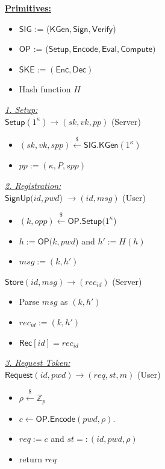 \documentclass[conference]{IEEEtran}
\newcommand{\secparameter}{\kappa}
\newcommand{\pwd}{pwd}
\newcommand{\sk}{sk}
\newcommand{\vk}{vk}
\newcommand{\pp}{pp}
\newcommand{\uid}{id}
\def\mg{\color{magenta}}
\begin{document}
\begin{figure}
\begin{multicols}{2} \raggedcolumns
\scriptsize
\underline{{\bf Primitives:}}
\begin{itemize}
    \item %
    $\mathsf{SIG}$ := ($\mathsf{KGen}, \mathsf{Sign}, \mathsf{Verify}$)
    \item %
    $\mathsf{OP}$ := ($\mathsf{Setup}, \mathsf{Encode}, \mathsf{Eval}, \mathsf{Compute})$
    \item %
    $\mathsf{SKE} := (\mathsf{Enc}, \mathsf{Dec})$
    \item Hash function $H$
\end{itemize}

\vspace{3mm}
\underline{{\em1. Setup:}}\\
$\mathsf{Setup}(1^{\secparameter}) \rightarrow (\sk, \vk, \pp)$ \hspace*{\fill} (Server) 
\begin{itemize}
    \item $(\sk,\vk, spp) \xleftarrow{\$} \mathsf{SIG.KGen}(1^{\secparameter})$ 
    \item $\pp := (\secparameter, P, spp)$ 
\end{itemize}
\underline{{\em2. Registration:}}\\
$\mathsf{SignUp}(\uid, \pwd$) $\rightarrow (\uid,msg)$ \hspace*{\fill} (User)
\begin{itemize}
    \item  $(k,opp) \xleftarrow{\$} \mathsf{OP.Setup}(1^{\secparameter}$) 
    \item  $h := \mathsf{OP}(k,\pwd$) and $h' := H(h)$
    \item  $msg := (k,h')$ %
\end{itemize}

$\mathsf{Store}(\uid, msg) \rightarrow (rec_{\uid})$ \hspace*{\fill} (Server)
\begin{itemize}
    \item Parse $msg$ as $(k,h')$
    \item $rec_{\uid} := (k,h')$
    \item $\mathsf{Rec}[\uid] = rec_{\uid}$
\end{itemize}

\columnbreak
\underline{{\em3. Request Token:}}\\
$\mathsf{Request}(\uid,\pwd) \rightarrow (req,st,m)$ \hspace*{\fill} (User)
\begin{itemize}
    \item $\rho \xleftarrow{\$} \mathbb{Z}_{p}$
    \item $c \leftarrow \mathsf{OP.Encode}(\pwd, \rho)$.
    \item $req := c$ and $st =: (\uid, \pwd, \rho)$
    \item return $req$
\end{itemize}


\end{multicols}
\end{figure}
\end{document}
